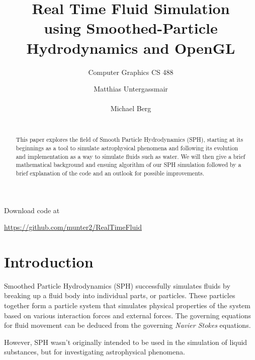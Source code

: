 \documentclass{sigchi}
\title{Real Time Fluid Simulation \\ \smaller using Smoothed-Particle Hydrodynamics and OpenGL}
\subtitle{Computer Graphics CS 488}
\author{
  \alignauthor Matthias Untergassmair\\
    \email{munter2@uic.edu}\\
  \alignauthor Michael Berg\\
    \email{mberg4@uic.edu}\\
}
\begin{document}
\maketitle


\begin{abstract}
	This paper explores the field of Smooth Particle Hydrodynamics (SPH), starting at its 
beginnings as a tool to simulate astrophysical phenomena and following its evolution and 
implementation as a way to simulate fluids such as water. We will then give a brief 
mathematical background and ensuing algorithm of our SPH simulation followed by a brief explanation of the code and an outlook for possible improvements.
\end{abstract}



Download code at
\begin{center}
	\url{https://github.com/munter2/RealTimeFluid}
\end{center}

\section{Introduction}
%
Smoothed Particle Hydrodynamics (SPH) successfully simulates fluids by breaking up a 
fluid body into individual parts, or particles. These particles together form a particle 
system that simulates physical properties of the system based on various interaction forces and external forces. 
The governing equations for fluid movement can be deduced from the governing \emph{Navier Stokes} equations.
\par\medskip
However, SPH wasn't originally intended to be used in the simulation of liquid substances, but for investigating astrophysical phenomena.
%
\end{document}
